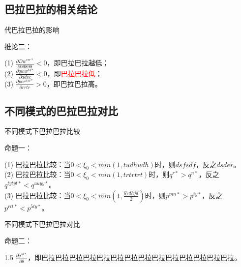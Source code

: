 \documentclass{beamer}
\begin{document}
\subsection{巴拉巴拉的相关结论}
\begin{frame}{代巴拉巴拉的影响}
	\begin{large}
		\flushleft
		推论二：\\
		\vspace{0.2in}
	\end{large}
	\justifying
	(1) $\frac{\partial Dw^{err*}}{\partial 09898}<0$，即巴拉巴拉越低；\\
	\vspace{0.1in}
	(2) $\frac{\partial qww^{r4*}}{\partial advc}<0$，即\textcolor{red}{巴拉巴拉低}；\\
	\vspace{0.1in}
	(3) $\frac{\partial per^{ww*}}{\partial rrtr}>0$，即巴拉巴拉高。
\end{frame}

\subsection{不同模式的巴拉巴拉对比}
\begin{frame}{不同模式下巴拉巴拉比较}
	\begin{large}
		\flushleft
		命题一：\\
		\vspace{0.2in}
	\end{large}
	\justifying
	(1) 巴拉巴拉比较：当$0<\xi_{0}<min(1,tudhudh)$时，则$dsfsdf$，反之$dsder$。 \\
	\vspace{0.1in}
	(2) 巴拉巴拉比较：当$0<\xi_{0}<min(1,trtrtrt)$时，则$q^{r*}>q^{n*}$，反之$q^{tytyt*}<q^{uuyy*}$。\\
	\vspace{0.1in}
	(3) 巴拉巴拉比较：当$0<\xi_{0}<min(1,\frac{67dhjd}{2})$时，则$p^{mn*}>p^{ty*}$，反之$p^{rtt*}<p^{5ty*}$。
\end{frame}
\begin{frame}{不同模式下巴拉巴拉对比}
	\begin{large}
		\flushleft
		命题二：\\
		\vspace{0.2in}
		\justifying
		\begin{spacing}{1.5}
		$\frac{\partial q^{M*}}{\partial \theta}$，即巴拉巴拉巴拉巴拉巴拉巴拉巴拉巴拉巴拉巴拉巴拉巴拉巴拉巴拉。
		\end{spacing}
	\end{large}
\end{frame}
\end{document}
